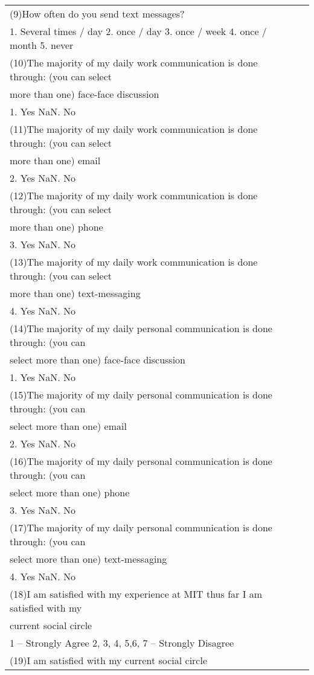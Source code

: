 \begin{longtable}[l]{l*{1}{l}}
(9)How often do you send text messages? \\
1. Several times / day 2. once / day 3. once / week 4. once / month 5. never \\
(10)The majority of my daily work communication is done through: (you can select\\
more than one) face-face discussion \\
1. Yes NaN. No \\
(11)The majority of my daily work communication is done through: (you can select\\
more than one) email \\
2. Yes NaN. No \\
(12)The majority of my daily work communication is done through: (you can select\\
more than one) phone \\
3. Yes NaN. No \\
(13)The majority of my daily work communication is done through: (you can select\\
more than one) text-messaging \\
4. Yes NaN. No \\
(14)The majority of my daily personal communication is done through: (you can \\
select more than one) face-face discussion \\
1. Yes NaN. No \\
(15)The majority of my daily personal communication is done through: (you can \\
select more than one) email \\
2. Yes NaN. No \\
(16)The majority of my daily personal communication is done through: (you can \\
select more than one) phone \\
3. Yes NaN. No \\
(17)The majority of my daily personal communication is done through: (you can \\
select more than one) text-messaging \\
4. Yes NaN. No \\
(18)I am satisfied with my experience at MIT thus far I am satisfied with my\\
current social circle  \\
1 – Strongly Agree 2, 3, 4, 5,6, 7 – Strongly Disagree \\
(19)I am satisfied with my current social circle \\

\end{longtable}
